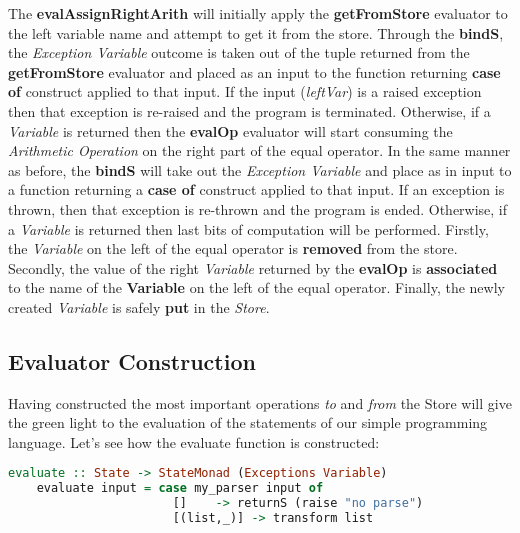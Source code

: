 \documentclass[a4paper, onecolumn]{article}
\begin{document}
    \noindent The \textbf{evalAssignRightArith} will initially apply the \textbf{getFromStore} evaluator to the left variable name and attempt to get it from the store. Through the \textbf{bindS}, the \textit{Exception Variable} outcome is taken out of the tuple returned from the \textbf{getFromStore} evaluator and placed as an input to the function returning \textbf{case of} construct applied to that input. If the input (\textit{leftVar}) is a raised exception then that exception is re-raised and the program is terminated. Otherwise, if a \textit{Variable} is returned then the \textbf{evalOp} evaluator will start consuming the \textit{Arithmetic Operation} on the right part of the equal operator. In the same manner as before, the \textbf{bindS} will take out the \textit{Exception Variable} and place as in input to a function returning a \textbf{case of} construct applied to that input. If an exception is thrown, then that exception is re-thrown and the program is ended. Otherwise, if a \textit{Variable} is returned then last bits of computation will be performed. Firstly, the \textit{Variable} on the left of the equal operator is \textbf{removed} from the store. Secondly, the value of the right \textit{Variable} returned by the \textbf{evalOp} is \textbf{associated} to the name of the \textbf{Variable} on the left of the equal operator. Finally, the newly created \textit{Variable} is safely \textbf{put} in the \textit{Store}. 
    
    
    \subsection{Evaluator Construction}
    
    Having constructed the most important operations \textit{to} and \textit{from} the Store will give the green light to the evaluation of the statements of our simple programming language. Let's see how the evaluate function is constructed: 
    
    \begin{tcolorbox}
    \begin{lstlisting}[language=Haskell] 
    evaluate :: State -> StateMonad (Exceptions Variable)
    evaluate input = case my_parser input of
                       []    -> returnS (raise "no parse") 
                       [(list,_)] -> transform list
    \end{lstlisting}
    \end{tcolorbox}
    
\end{document}
